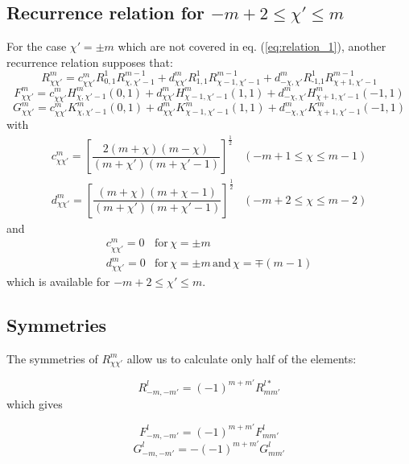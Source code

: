 \subsection{Recurrence relation for $-m+2\leq\chi'\leq m$}

For the case $\chi'=\pm m$ which are not covered in eq. (\ref{eq:relation_1}),
another recurrence relation supposes that:
\begin{equation}
R_{\chi\chi'}^{m}=c_{\chi\chi'}^{m}R_{0,1}^{1}R_{\chi,\chi'-1}^{m-1}+d_{\chi\chi'}^{m}R_{1,1}^{1}R_{\chi-1,\chi'-1}^{m-1}+d_{-\chi,\chi'}^{m}R_{\text{-1,}1}^{1}R_{\chi+1,\chi'-1}^{m-1}
\end{equation}
\begin{equation}
F_{\chi\chi'}^{m}=c_{\chi\chi'}^{m}H_{\chi,\chi'-1}^{m}(0,1)+d_{\chi\chi'}^{m}H_{\chi-1,\chi'-1}^{m}(1,1)+d_{-\chi,\chi'}^{m}H_{\chi+1,\chi'-1}^{m}(-1,1)
\end{equation}
\begin{equation}
G_{\chi\chi'}^{m}=c_{\chi\chi'}^{m}K_{\chi,\chi'-1}^{m}(0,1)+d_{\chi\chi'}^{m}K_{\chi-1,\chi'-1}^{m}(1,1)+d_{-\chi,\chi'}^{m}K_{\chi+1,\chi'-1}^{m}(-1,1)
\end{equation}
with
\begin{equation}
\begin{array}{ll}
c_{\chi\chi'}^{m}=\left[\dfrac{2\left(m+\chi\right)\left(m-\chi\right)}{\left(m+\chi'\right)\left(m+\chi'-1\right)}\right]^{\frac{1}{2}} & (-m+1\leq\chi\leq m-1)\\
d_{\chi\chi'}^{m}=\left[\dfrac{\left(m+\chi\right)\left(m+\chi-1\right)}{\left(m+\chi'\right)\left(m+\chi'-1\right)}\right]^{\frac{1}{2}} & (-m+2\leq\chi\leq m-2)
\end{array}
\end{equation}
and
\begin{equation}
\begin{array}{ll}
c_{\chi\chi'}^{m}=0 & \mathrm{for}\,\chi=\pm m\\
d_{\chi\chi'}^{m}=0 & \mathrm{for}\,\chi=\pm m\,\mathrm{and}\,\chi=\mp(m-1)
\end{array}
\end{equation}
which is available for $-m+2\leq\chi'\leq m$.

\subsection{Symmetries}

The symmetries of $R_{\chi\chi'}^{m}$ allow us to calculate only
half of the elements: 

\begin{equation}
R_{-m,-m'}^{l}=\left(-1\right)^{m+m'}R_{mm'}^{l*}
\end{equation}
which gives

\begin{equation}
F_{-m,-m'}^{l}=\left(-1\right)^{m+m'}F_{mm'}^{l}
\end{equation}
\begin{equation}
G_{-m,-m'}^{l}=-\left(-1\right)^{m+m'}G_{mm'}^{l}
\end{equation}

